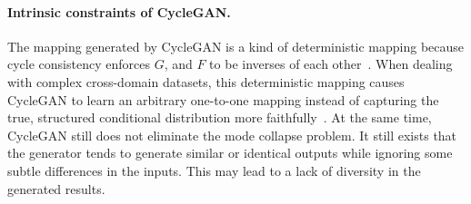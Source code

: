 \paragraph{Intrinsic constraints of CycleGAN.} The mapping generated by CycleGAN is a kind of deterministic mapping because cycle consistency enforces $G$, and $F$ to be inverses of each other~\cite{almahairi2018augmented}. When dealing with complex cross-domain datasets, this deterministic mapping causes CycleGAN to learn an arbitrary one-to-one mapping instead of capturing the true, structured conditional distribution more faithfully~\cite{almahairi2018augmented}. At the same time, CycleGAN still does not eliminate the mode collapse problem. It still exists that the generator tends to generate similar or identical outputs while ignoring some subtle differences in the inputs. This may lead to a lack of diversity in the generated results.

\newpage
